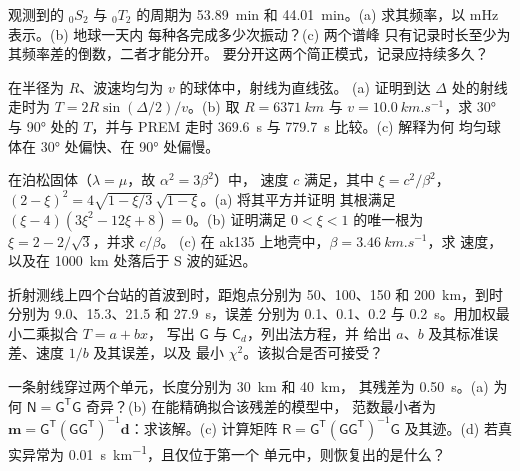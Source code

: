 \begin{exercise}[$\star$]\label{exo:b3:seismology-imaging:4}
观测到的 ${}_0S_2$ 与 ${}_0T_2$ 的周期为 \qty{53.89}{min} 和
\qty{44.01}{min}。(a) 求其频率，以 \unit{mHz} 表示。(b) 地球一天内
每种各完成多少次振动？(c) 两个谱峰
只有记录时长至少为其频率差的倒数，二者才能分开。
要分开这两个简正模式，记录应持续多久？
\end{exercise}

\begin{exercise}[$\star\star$]\label{exo:b3:seismology-imaging:5}
在半径为 $R$、波速均匀为 $v$ 的球体中，射线为直线弦。
(a) 证明到达 $\Delta$ 处的射线
走时为 $T = 2R\sin(\Delta/2)/v$。(b) 取 $R = \qty{6371}{km}$ 与
$v = \qty{10.0}{km.s^{-1}}$，求 \ang{30} 与 \ang{90} 处的 $T$，并与
PREM 走时 \qty{369.6}{s} 与 \qty{779.7}{s} 比较。(c) 解释为何
均匀球体在 \ang{30} 处偏快、在 \ang{90} 处偏慢。
\end{exercise}

\begin{exercise}[$\star\star$]\label{exo:b3:seismology-imaging:6}
在泊松固体（$\lambda = \mu$，故 $\alpha^2 = 3\beta^2$）中，
速度 $c$ 满足，其中 $\xi = c^2/\beta^2$，
$(2 - \xi)^2 = 4\sqrt{1 - \xi/3}\,\sqrt{1 - \xi}$。(a) 将其平方并证明
其根满足 $(\xi - 4)(3\xi^2 - 12\xi + 8) = 0$。(b) 证明满足
$0 < \xi < 1$ 的唯一根为 $\xi = 2 - 2/\sqrt3$，并求 $c/\beta$。
(c) 在 ak135 上地壳中，$\beta = \qty{3.46}{km.s^{-1}}$，求
速度，以及在
\qty{1000}{km} 处落后于 S 波的延迟。
\end{exercise}

\begin{exercise}[$\star\star$]\label{exo:b3:seismology-imaging:7}
折射测线上四个台站的首波到时，距炮点分别为 50、100、150 和
\qty{200}{km}，到时分别为 9.0、15.3、21.5 和 \qty{27.9}{s}，误差
分别为 0.1、0.1、0.2 与 \qty{0.2}{s}。用加权最小二乘拟合 $T = a + bx$，
写出 $\mathsf G$ 与 $\mathsf C_d$，列出法方程，并
给出 $a$、$b$ 及其标准误差、速度 $1/b$ 及其误差，以及
最小 $\chi^2$。该拟合是否可接受？
\end{exercise}

\begin{exercise}[$\star\star$]\label{exo:b3:seismology-imaging:8}
一条射线穿过两个单元，长度分别为 \qty{30}{km} 和 \qty{40}{km}，
其残差为 \qty{0.50}{s}。(a) 为何 $\mathsf N = \mathsf G^{\mathsf T}
\mathsf G$ 奇异？(b) 在能精确拟合该残差的模型中，
范数最小者为 $\mathbf m = \mathsf G^{\mathsf T}(\mathsf G\mathsf
G^{\mathsf T})^{-1}\mathbf d$：求该解。(c) 计算矩阵
$\mathsf R = \mathsf G^{\mathsf T}(\mathsf G\mathsf G^{\mathsf T})^{-1}\mathsf G$
及其迹。(d) 若真实异常为 \qty{0.01}{s.km^{-1}}，且仅位于第一个
单元中，则恢复出的是什么？
\end{exercise}

